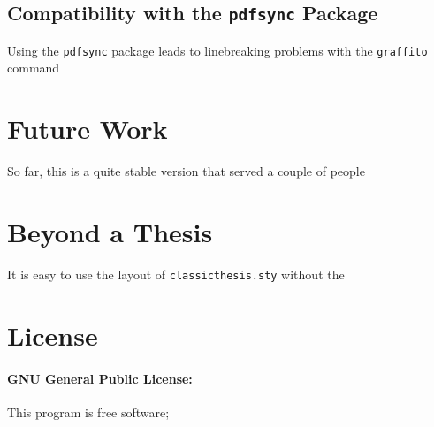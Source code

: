 \subsection*{Compatibility with the \texttt{pdfsync} Package}
Using the \texttt{pdfsync} package leads to linebreaking problems with the \texttt{graffito} command 

\section{Future Work}
So far, this is a quite stable version that served a couple of people


\section{Beyond a Thesis}
It is easy to use the layout of \texttt{classicthesis.sty} without the


\section{License}
\paragraph{GNU General Public License:} This program is free software;
